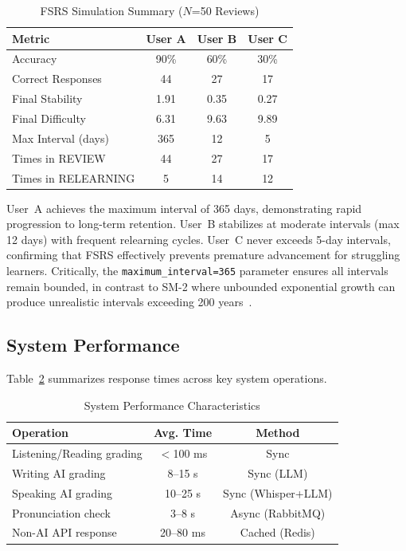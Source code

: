 \documentclass[conference]{IEEEtran}
\begin{document}
\begin{table}[!t]
\caption{FSRS Simulation Summary ($N$=50 Reviews)}
\label{tab:fsrs}
\centering
\begin{tabular}{lccc}
\toprule
\textbf{Metric} & \textbf{User A} & \textbf{User B} & \textbf{User C} \\
\midrule
Accuracy               & 90\%  & 60\%  & 30\% \\
Correct Responses      & 44    & 27    & 17 \\
Final Stability        & 1.91  & 0.35  & 0.27 \\
Final Difficulty       & 6.31  & 9.63  & 9.89 \\
Max Interval (days)    & 365   & 12    & 5 \\
Times in REVIEW        & 44    & 27    & 17 \\
Times in RELEARNING    & 5     & 14    & 12 \\
\bottomrule
\end{tabular}
\end{table}

User~A achieves the maximum interval of 365 days, demonstrating rapid progression to long-term retention. User~B stabilizes at moderate intervals (max 12 days) with frequent relearning cycles. User~C never exceeds 5-day intervals, confirming that FSRS effectively prevents premature advancement for struggling learners. Critically, the \texttt{maximum\_interval=365} parameter ensures all intervals remain bounded, in contrast to SM-2 where unbounded exponential growth can produce unrealistic intervals exceeding 200 years~\cite{sm2}.

\subsection{System Performance}

Table~\ref{tab:performance} summarizes response times across key system operations.

\begin{table}[!t]
\caption{System Performance Characteristics}
\label{tab:performance}
\centering
\begin{tabular}{lcc}
\toprule
\textbf{Operation} & \textbf{Avg. Time} & \textbf{Method} \\
\midrule
Listening/Reading grading & $<$100 ms & Sync \\
Writing AI grading        & 8--15 s   & Sync (LLM) \\
Speaking AI grading       & 10--25 s  & Sync (Whisper+LLM) \\
Pronunciation check       & 3--8 s    & Async (RabbitMQ) \\
Non-AI API response       & 20--80 ms & Cached (Redis) \\
\bottomrule
\end{tabular}
\end{table}
\end{document}
